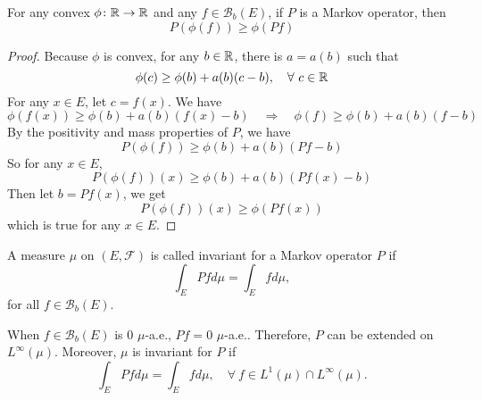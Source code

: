 \begin{prop}
    For any convex $\phi \colon \mathbb{R} \rightarrow \mathbb{R}$ and any $f \in \mathcal{B}_b(E)$, if $P$ is a Markov operator, then
    \begin{equation*}
        P(\phi(f)) \geq \phi(Pf)
    \end{equation*}
\end{prop}
\begin{proof}
    Because $\phi$ is convex, for any $b \in \mathbb{R}$, there is $a = a(b)$ such that
    \begin{equation*}
        \phi(c) \geq \phi(b) + a(b)(c - b),\quad \forall~c \in \mathbb{R}
    \end{equation*}
    For any $x \in E$, let $c = f(x)$. We have
    \begin{equation*}
        \phi(f(x)) \geq \phi(b) + a(b)(f(x) - b)\quad \Rightarrow \quad \phi(f) \geq \phi(b) + a(b)(f - b)
    \end{equation*}
    By the positivity and mass properties of $P$, we have
    \begin{equation*}
        P(\phi(f)) \geq \phi(b) + a(b)(Pf - b)
    \end{equation*}
    So for any $x \in E$,
    \begin{equation*}
         P(\phi(f))(x) \geq \phi(b) + a(b)(Pf(x) - b)
    \end{equation*}
    Then let $b = Pf(x)$, we get
    \begin{equation*}
        P(\phi(f))(x) \geq \phi(Pf(x))
    \end{equation*}
    which is true for any $x \in E$.
\end{proof}

\begin{defn}
    A measure $\mu$ on $(E,\mathcal{F})$ is called invariant for a Markov operator $P$ if
    \begin{equation*}
    	\int_E Pf d\mu = \int_E f d\mu,
    \end{equation*}
    for all $f \in \mathcal{B}_b(E)$.
\end{defn}
\begin{rmk}
    When $f \in \mathcal{B}_b(E)$ is $0$ $\mu$-a.e., $Pf = 0$ $\mu$-a.e.. Therefore, $P$ can be extended on $L^\infty(\mu)$. Moreover, $\mu$ is invariant for $P$ if
    \begin{equation*}
    	\int_E Pf d\mu = \int_E f d\mu,\quad \forall~f \in L^1(\mu) \cap L^\infty(\mu).
    \end{equation*}
\end{rmk}

